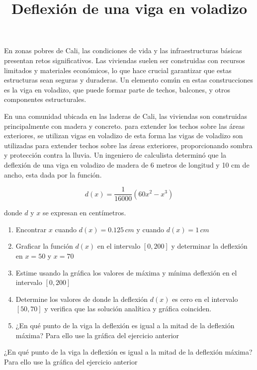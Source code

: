 \documentclass{article}
\begin{document}
\title{Deflexión de una viga en voladizo}
\author{}
\date{}
\maketitle


En zonas pobres de Cali, las condiciones de vida y las infraestructuras básicas presentan retos significativos. Las viviendas suelen ser construidas con recursos limitados y materiales económicos, lo que hace crucial garantizar que estas estructuras sean seguras y duraderas. Un elemento común en estas construcciones es la viga en voladizo, que puede formar parte de techos, balcones, y otros componentes estructurales.

En una comunidad ubicada en las laderas de Cali, las viviendas son construidas principalmente con madera y concreto. para extender los techos sobre las áreas exteriores, se utilizan vigas en voladizo de esta forma las vigas de voladizo son utilizadas para extender techos sobre las áreas exteriores, proporcionando sombra y protección contra la lluvia. Un ingeniero de calculista determinó que la deflexión de una viga en voladizo de madera de 6 metros de longitud y 10 cm de ancho, esta dada por la función.

$$d(x)=\frac{1}{16000}(60x^2-x^3)$$

 

donde $d$
 y  $x$
 se expresan en centímetros.

\begin{enumerate}
    \item Encontrar $x$ cuando $d(x)=0.125\, cm$ y cuando $d(x)=1\, cm$
\item Graficar la función $d(x)$ en el intervalo $[0,200]$ 
 y determinar la deflexión en $x=50$ y $x=70$
 \item Estime usando la gráfica los valores de máxima y mínima deflexión en el intervalo $[0,200]$
 \item Determine los valores de 
donde la deflexión $d(x)$ es cero en el intervalo $[50,70]$
 y verifica que las solución analítica y gráfica coinciden.
 \item ¿En qué punto de la viga la deflexión es igual a la mitad de la deflexión máxima? Para ello use la gráfica del ejercicio anterior
\end{enumerate}




¿En qué punto de la viga la deflexión es igual a la mitad de la deflexión máxima? Para ello use la gráfica del ejercicio anterior
\end{document}
